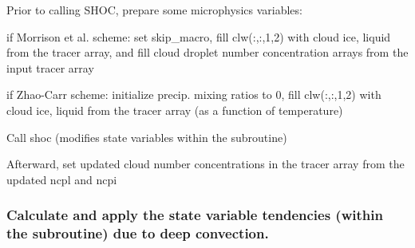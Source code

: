 \begin{DoxyItemize}
\item Prior to calling S\+H\+OC, prepare some microphysics variables\+:
\begin{DoxyItemize}
\item if Morrison et al. scheme\+: set \textquotesingle{}skip\+\_\+macro\textquotesingle{}, fill clw(\+:,\+:,1,2) with cloud ice, liquid from the tracer array, and fill cloud droplet number concentration arrays from the input tracer array
\item if Zhao-\/\+Carr scheme\+: initialize precip. mixing ratios to 0, fill clw(\+:,\+:,1,2) with cloud ice, liquid from the tracer array (as a function of temperature)
\end{DoxyItemize}
\item Call \textquotesingle{}shoc\textquotesingle{} (modifies state variables within the subroutine)
\item Afterward, set updated cloud number concentrations in the tracer array from the updated \textquotesingle{}ncpl\textquotesingle{} and \textquotesingle{}ncpi\textquotesingle{}
\end{DoxyItemize}

\subsubsection*{Calculate and apply the state variable tendencies (within the subroutine) due to deep convection.}


